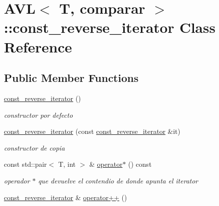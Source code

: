 \hypertarget{classAVL_1_1const__reverse__iterator}{\section{A\-V\-L$<$ T, comparar $>$\-:\-:const\-\_\-reverse\-\_\-iterator Class Reference}
\label{classAVL_1_1const__reverse__iterator}
}
\subsection*{Public Member Functions}
\begin{DoxyCompactItemize}
\item 
\hypertarget{classAVL_1_1const__reverse__iterator_a82006bf296e91a56bf7a7dab05a66105}{\hyperlink{classAVL_1_1const__reverse__iterator_a82006bf296e91a56bf7a7dab05a66105}{const\-\_\-reverse\-\_\-iterator} ()}\label{classAVL_1_1const__reverse__iterator_a82006bf296e91a56bf7a7dab05a66105}

\begin{DoxyCompactList}\small\item\em constructor por defecto \end{DoxyCompactList}\item 
\hyperlink{classAVL_1_1const__reverse__iterator_a91494e2d60cbd8d0e0273efc7146f800}{const\-\_\-reverse\-\_\-iterator} (const \hyperlink{classAVL_1_1const__reverse__iterator}{const\-\_\-reverse\-\_\-iterator} \&it)
\begin{DoxyCompactList}\small\item\em constructor de copia \end{DoxyCompactList}\item 
\hypertarget{classAVL_1_1const__reverse__iterator_a940a64c5b7ca7fb225860c36d8c3748b}{const std\-::pair$<$ T, int $>$ \& \hyperlink{classAVL_1_1const__reverse__iterator_a940a64c5b7ca7fb225860c36d8c3748b}{operator$\ast$} () const }\label{classAVL_1_1const__reverse__iterator_a940a64c5b7ca7fb225860c36d8c3748b}

\begin{DoxyCompactList}\small\item\em operador $\ast$ que devuelve el contendio de donde apunta el iterator \end{DoxyCompactList}\item 
\hypertarget{classAVL_1_1const__reverse__iterator_a1d44ead185e4bfcc7902b209880c132c}{\hyperlink{classAVL_1_1const__reverse__iterator}{const\-\_\-reverse\-\_\-iterator} \& \hyperlink{classAVL_1_1const__reverse__iterator_a1d44ead185e4bfcc7902b209880c132c}{operator++} ()}\label{classAVL_1_1const__reverse__iterator_a1d44ead185e4bfcc7902b209880c132c}


\end{DoxyCompactItemize}
